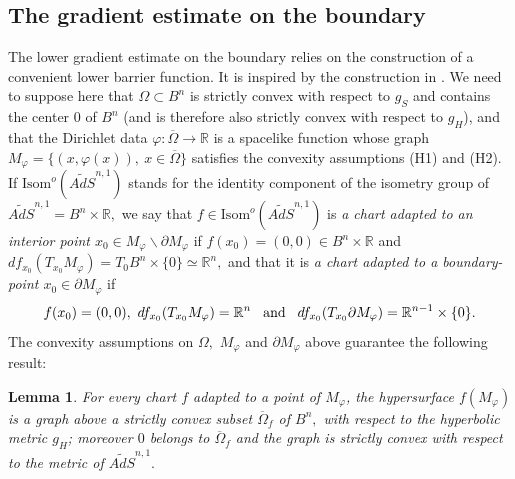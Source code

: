 \documentclass[10pt,reqno,oneside]{amsart}
\newtheorem{lem}{Lemma}[section]
\theoremstyle{definition}
\theoremstyle{remark}
\newcommand{\R}{\mathbb{R}}
\begin{document}
\subsection{The gradient estimate on the boundary}
The lower gradient estimate on the boundary relies on the construction of a convenient lower barrier function. It is inspired by the construction in \cite{De}. We need to suppose here that $\Omega\subset B^n$ is strictly convex with respect to $g_{S}$ and contains the center $0$ of $B^n$ (and is therefore also strictly convex with respect to $g_H$), and that the Dirichlet data $\varphi:\overline{\Omega}\rightarrow\R$ is a spacelike function whose graph $M_{\varphi}=\{(x,\varphi(x)),\ x\in\overline{\Omega}\}$ satisfies the convexity assumptions (H1) and (H2). If $\mbox{Isom}^o(\widetilde{AdS}^{n,1})$ stands for the identity component of the isometry group of $\widetilde{AdS}^{n,1}=B^n\times\R,$ we say that $f\in\mbox{Isom}^o(\widetilde{AdS}^{n,1})$ is \emph{a chart adapted to an interior point $x_0\in M_{\varphi}\backslash\partial M_{\varphi}$} if $f(x_0)=(0,0)\in B^n\times\R$ and $df_{x_0}(T_{x_0}M_{\varphi})=T_0B^n\times\{0\}\simeq\R^n,$ and that it is \emph{a chart adapted to a boundary-point $x_0\in\partial M_{\varphi}$} if
\begin{equation}\label{cond f chart adapted boundary point}
f(x_0)=(0,0),\ df_{x_0}(T_{x_0}M_{\varphi})=\R^n\hspace{.3cm}\mbox{and}\hspace{.3cm}df_{x_0}(T_{x_0}\partial M_{\varphi})=\R^{n-1}\times\{0\}.
\end{equation}
The convexity assumptions on $\Omega,$ $M_{\varphi}$ and $\partial M_{\varphi}$ above guarantee the following result:
\begin{lem}\label{est C1 lem Omega convex}
For every chart $f$ adapted to a point of $M_{\varphi}$, the hypersurface $f(M_{\varphi})$ is a graph above a strictly convex subset $\overline{\Omega}_f$ of $B^n,$ with respect to the hyperbolic metric $g_H$; moreover $0$ belongs to $\overline{\Omega}_f$ and the graph is strictly convex with respect to the metric of $\widetilde{AdS}^{n,1}.$ 
\end{lem}
\end{document}
